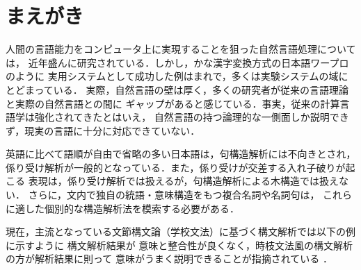 \documentclass[japanese]{jnlp_1.2}
\begin{document}
\maketitle
\vspace{-1\baselineskip}



\section{まえがき}
人間の言語能力をコンピュータ上に実現することを狙った自然言語処理については，
近年盛んに研究されている．しかし，かな漢字変換方式の日本語ワープロのように
実用システムとして成功した例はまれで，多くは実験システムの域にとどまっている．
実際，自然言語の壁は厚く，多くの研究者が従来の言語理論と実際の自然言語との間に
ギャップがあると感じている．事実，従来の計算言語学は強化されてきたとはいえ，
自然言語の持つ論理的な一側面しか説明できず，現実の言語に十分に対応できていない．

英語に比べて語順が自由で省略の多い日本語は，句構造解析には不向きとされ，
係り受け解析が一般的となっている．また，係り受けが交差する入れ子破りが起こる
表現は，係り受け解析では扱えるが，句構造解析による木構造では扱えない．
さらに，文内で独自の統語・意味構造をもつ複合名詞や名詞句は，
これらに適した個別的な構造解析法を模索する必要がある．

現在，主流となっている文節構文論（学校文法）に基づく構文解析では以下の例に示すように
構文解析結果が
意味と整合性が良くなく，時枝文法風の構文解析の方が解析結果に則って
意味がうまく説明できることが指摘されている
\cite{水谷1993}
．
\end{document}
